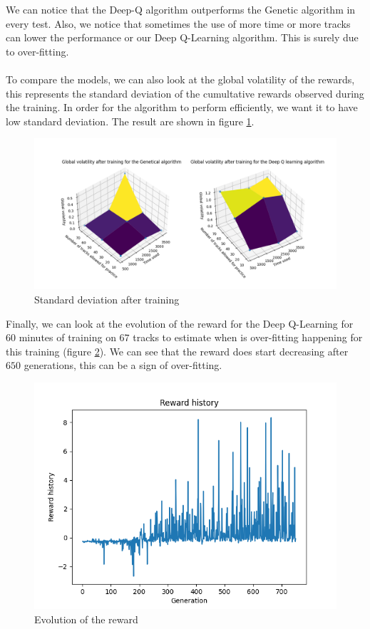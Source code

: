 \documentclass[11pt,a4paper]{article}
\newcounter{fig}
\begin{document}
We can notice that the Deep-Q algorithm outperforms the Genetic algorithm in every test. Also, we notice that sometimes the use of more time or more tracks can lower the performance or our Deep Q-Learning algorithm. This is surely due to over-fitting.\\
\\
To compare the models, we can also look at the global volatility of the rewards, this represents the standard deviation of the cumultative rewards observed during the training. In order for the algorithm to perform efficiently, we want it to have low standard deviation. The result are shown in figure \ref{figure:standard deviation}.
        \begin{figure}[ht]
            \centering
            \includegraphics[scale = 0.55]{comparaison3.png}
            \caption{Standard deviation after training}
            \label{figure:standard deviation}
        \end{figure}
 
\newpage
Finally, we can look at the evolution of the reward for the Deep Q-Learning for $60$ minutes of training on $67$ tracks to estimate when is over-fitting happening for this training (figure \ref{figure:evolution of the reward}). We can see that the reward does start decreasing after $650$ generations, this can be a sign of over-fitting.
        \begin{figure}[ht]
            \centering
            \includegraphics[width=0.5\linewidth]{graphe_reward.png}
            \caption{Evolution of the reward}
            \label{figure:evolution of the reward}
        \end{figure}
        
\end{document}
